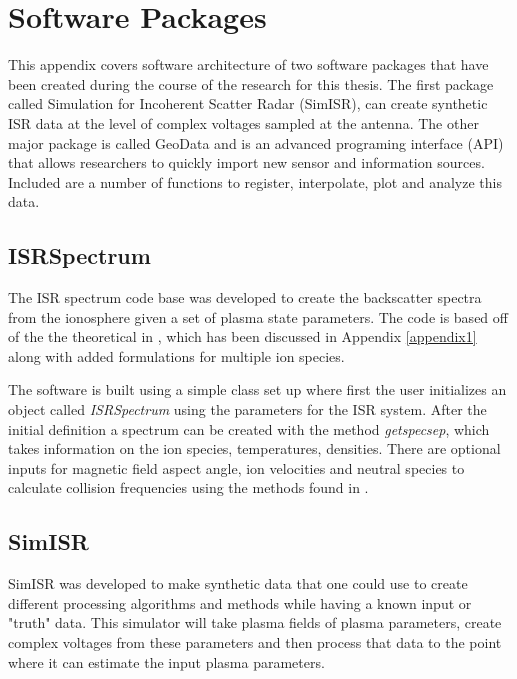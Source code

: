 \chapter{Software Packages}
\label{chapter:appsoft}
\thispagestyle{myheadings}

\graphicspath{{Appendix/Figures/}}


This appendix covers software architecture of two software packages that have been created during the course of the research for this thesis. The first package called Simulation for Incoherent Scatter Radar (SimISR), can create synthetic ISR data at the level of complex voltages sampled at the antenna. The other major package is called GeoData and is an advanced programing interface (API) that allows researchers to quickly import new sensor and information sources. Included are a number of functions to register, interpolate, plot and analyze this data.

\section{ISRSpectrum}
The ISR spectrum code base was developed to create the backscatter spectra from the ionosphere given a set of plasma state parameters. The code is based off of the the theoretical in \citet{kudeki:milla:1}, which has been discussed in Appendix \ref{appendix1} along with added formulations for multiple ion species.

The software is built using a simple class set up where first the user initializes an object called \textit{ISRSpectrum} using the parameters for the ISR system. After the initial definition a spectrum can be created with the method \textit{getspecsep}, which takes information on the ion species, temperatures, densities. There are optional inputs for magnetic field aspect angle, ion velocities and neutral species to calculate collision frequencies using the methods found in \citet{schunk2004ionospheres}.

\section{SimISR}

SimISR was developed to make synthetic data that one could use to create different processing algorithms and methods while having a known input or "truth" data. This simulator will take plasma fields of plasma parameters, create complex voltages from these parameters and then process that data to the point where it can estimate the input plasma parameters.

